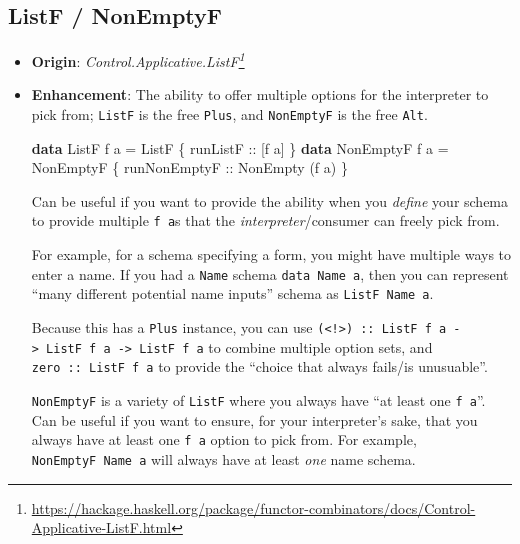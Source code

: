 \documentclass[]{article}
\newenvironment{Shaded}{}{}
\newcommand{\DataTypeTok}[1]{\textcolor[rgb]{0.56,0.13,0.00}{#1}}
\newcommand{\KeywordTok}[1]{\textcolor[rgb]{0.00,0.44,0.13}{\textbf{#1}}}
\newcommand{\NormalTok}[1]{#1}
\newcommand{\OtherTok}[1]{\textcolor[rgb]{0.00,0.44,0.13}{#1}}
\renewcommand{\href}[2]{#2\footnote{\url{#1}}}
\begin{document}
\hypertarget{listf-nonemptyf}{%
\subsection{ListF / NonEmptyF}\label{listf-nonemptyf}}

\begin{itemize}
\item
  \textbf{Origin}:
  \emph{\href{https://hackage.haskell.org/package/functor-combinators/docs/Control-Applicative-ListF.html}{Control.Applicative.ListF}}
\item
  \textbf{Enhancement}: The ability to offer multiple options for the
  interpreter to pick from; \texttt{ListF} is the free \texttt{Plus}, and
  \texttt{NonEmptyF} is the free \texttt{Alt}.

\begin{Shaded}
\begin{Highlighting}[]
\KeywordTok{data} \DataTypeTok{ListF}\NormalTok{     f a }\OtherTok{=} \DataTypeTok{ListF}\NormalTok{     \{}\OtherTok{ runListF     ::}\NormalTok{ [f a]          \}}
\KeywordTok{data} \DataTypeTok{NonEmptyF}\NormalTok{ f a }\OtherTok{=} \DataTypeTok{NonEmptyF}\NormalTok{ \{}\OtherTok{ runNonEmptyF ::} \DataTypeTok{NonEmpty}\NormalTok{ (f a) \}}
\end{Highlighting}
\end{Shaded}

  Can be useful if you want to provide the ability when you \emph{define} your
  schema to provide multiple \texttt{f\ a}s that the \emph{interpreter}/consumer
  can freely pick from.

  For example, for a schema specifying a form, you might have multiple ways to
  enter a name. If you had a \texttt{Name} schema \texttt{data\ Name\ a}, then
  you can represent ``many different potential name inputs'' schema as
  \texttt{ListF\ Name\ a}.

  Because this has a \texttt{Plus} instance, you can use
  \texttt{(\textless{}!\textgreater{})\ ::\ ListF\ f\ a\ -\textgreater{}\ ListF\ f\ a\ -\textgreater{}\ ListF\ f\ a}
  to combine multiple option sets, and \texttt{zero\ ::\ ListF\ f\ a} to provide
  the ``choice that always fails/is unusuable''.

  \texttt{NonEmptyF} is a variety of \texttt{ListF} where you always have ``at
  least one \texttt{f\ a}''. Can be useful if you want to ensure, for your
  interpreter's sake, that you always have at least one \texttt{f\ a} option to
  pick from. For example, \texttt{NonEmptyF\ Name\ a} will always have at least
  \emph{one} name schema.


\end{itemize}
\end{document}
